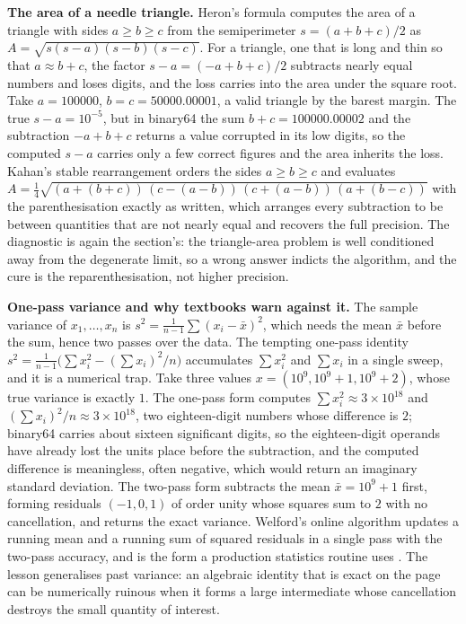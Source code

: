 \begin{example}
\textbf{The area of a needle triangle.} Heron's formula computes the area of
a triangle with sides $a \geq b \geq c$ from the semiperimeter $s = (a + b +
c)/2$ as $A = \sqrt{s(s-a)(s-b)(s-c)}$. For a  triangle, one
that is long and thin so that $a \approx b + c$, the factor $s - a = (-a + b +
c)/2$ subtracts nearly equal numbers and loses digits, and the loss carries
into the area under the square root. Take $a = 100000$, $b = c = 50000.00001$,
a valid triangle by the barest margin. The true $s - a = 10^{-5}$, but in
binary64 the sum $b + c = 100000.00002$ and the subtraction $-a + b + c$
returns a value corrupted in its low digits, so the computed $s - a$ carries
only a few correct figures and the area inherits the loss. Kahan's stable
rearrangement orders the sides $a \geq b \geq c$ and evaluates $A =
\tfrac{1}{4}\sqrt{(a + (b + c))\,(c - (a - b))\,(c + (a - b))\,(a + (b - c))}$
with the parenthesisation exactly as written, which arranges every subtraction
to be between quantities that are not nearly equal and recovers the full
precision. The diagnostic is again the section's: the triangle-area problem is
well conditioned away from the degenerate limit, so a wrong answer indicts the
algorithm, and the cure is the reparenthesisation, not higher precision.
\end{example}

\begin{example}
\textbf{One-pass variance and why textbooks warn against it.} The sample
variance of $x_{1}, \ldots, x_{n}$ is $s^{2} = \tfrac{1}{n-1}\sum(x_{i} -
\bar{x})^{2}$, which needs the mean $\bar{x}$ before the sum, hence two passes
over the data. The tempting one-pass identity $s^{2} = \tfrac{1}{n-1}\big(\sum
x_{i}^{2} - (\sum x_{i})^{2}/n\big)$ accumulates $\sum x_{i}^{2}$ and $\sum
x_{i}$ in a single sweep, and it is a numerical trap. Take three values
$x = (10^{9}, 10^{9} + 1, 10^{9} + 2)$, whose true variance is exactly $1$.
The one-pass form computes $\sum x_{i}^{2} \approx 3 \times 10^{18}$ and
$(\sum x_{i})^{2}/n \approx 3 \times 10^{18}$, two eighteen-digit numbers
whose difference is $2$; binary64 carries about sixteen significant digits, so
the eighteen-digit operands have already lost the units place before the
subtraction, and the computed difference is meaningless, often negative, which
would return an imaginary standard deviation. The two-pass form subtracts the
mean $\bar{x} = 10^{9} + 1$ first, forming residuals $(-1, 0, 1)$ of order
unity whose squares sum to $2$ with no cancellation, and returns the exact
variance. Welford's online algorithm updates a running mean and a running sum
of squared residuals in a single pass with the two-pass accuracy, and is the
form a production statistics routine uses \cite{text:v2ch16-mccullough-vinod-1999}.
The lesson generalises past variance: an algebraic identity that is exact on
the page can be numerically ruinous when it forms a large intermediate whose
cancellation destroys the small quantity of interest.
\end{example}

